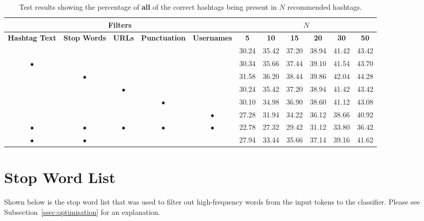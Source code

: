 \documentclass[11pt,a4paper]{report}
\begin{document}
\begin{subappendices}
\begin{landscape}
\begin{table}[H]
    \centering
    \small
    \begin{tabular}{|c|c|c|c|c||c|c|c|c|c|c|}
        \hline
        \multicolumn{5}{|c||}{Filters} & \multicolumn{6}{|c|}{$N$} \\
        \hline
        \textbf{Hashtag Text} & \textbf{Stop Words} & \textbf{URLs} & \textbf{Punctuation} & \textbf{Usernames} & \textbf{5} & \textbf{10} & \textbf{15} & \textbf{20} & \textbf{30} & \textbf{50} \\
        \hline
        \hline
        & & & & & 30.24 & 35.42 & 37.20 & 38.94 & 41.42 & 43.42 \\
        \hline
        $\bullet$ & & & & & 30.34 & 35.66 & 37.44 & 39.10 & 41.54 & 43.70 \\
        \hline
        & $\bullet$ & & & & 31.58 & 36.20 & 38.44 & 39.86 & 42.04 & 44.28 \\
        \hline
        & & $\bullet$ & & & 30.24 & 35.42 & 37.20 & 38.94 & 41.42 & 43.42 \\
        \hline
        & & & $\bullet$ & & 30.10 & 34.98 & 36.90 & 38.60 & 41.12 & 43.08 \\
        \hline
        & & & & $\bullet$ & 27.28 & 31.94 & 34.22 & 36.12 & 38.66 & 40.92 \\
        \hline
        $\bullet$ & $\bullet$ & $\bullet$ & $\bullet$ & $\bullet$ & 22.78 & 27.32 & 29.42 & 31.12 & 33.80 & 36.42 \\
        \hline
        $\bullet$ & $\bullet$ & & & & 27.94 & 33.44 & 35.66 & 37.14 & 39.16 & 41.62 \\
        \hline
    \end{tabular}
    \caption*{Test results showing the percentage of \textbf{all} of the correct hashtags being present in $N$ recommended hashtags.}
\end{table}
\end{landscape}
\pagebreak

\section{Stop Word List}
\label{appendix:stopwords}
Shown below is the stop word list that was used to filter out high-frequency words from the input tokens to the classifier. Please see Subsection~\ref{ssec:optimisation} for an explanation.


\end{subappendices}
\end{document}
